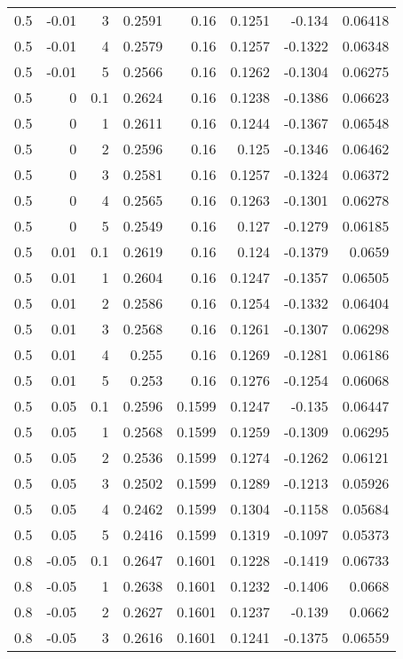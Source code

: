 \documentclass{amsart}
\theoremstyle{plain}
\numberwithin{equation}{section}
\begin{document}
\begin{longtable}{r | r | r | r | r | r | r | r}
0.5 & -0.01 & 3 & 0.2591 & 0.16 & 0.1251 & -0.134 & 0.06418 \\
0.5 & -0.01 & 4 & 0.2579 & 0.16 & 0.1257 & -0.1322 & 0.06348 \\
0.5 & -0.01 & 5 & 0.2566 & 0.16 & 0.1262 & -0.1304 & 0.06275 \\ \hline
0.5 & 0 & 0.1 & 0.2624 & 0.16 & 0.1238 & -0.1386 & 0.06623 \\
0.5 & 0 & 1 & 0.2611 & 0.16 & 0.1244 & -0.1367 & 0.06548 \\
0.5 & 0 & 2 & 0.2596 & 0.16 & 0.125 & -0.1346 & 0.06462 \\
0.5 & 0 & 3 & 0.2581 & 0.16 & 0.1257 & -0.1324 & 0.06372 \\
0.5 & 0 & 4 & 0.2565 & 0.16 & 0.1263 & -0.1301 & 0.06278 \\
0.5 & 0 & 5 & 0.2549 & 0.16 & 0.127 & -0.1279 & 0.06185 \\ \hline
0.5 & 0.01 & 0.1 & 0.2619 & 0.16 & 0.124 & -0.1379 & 0.0659 \\
0.5 & 0.01 & 1 & 0.2604 & 0.16 & 0.1247 & -0.1357 & 0.06505 \\
0.5 & 0.01 & 2 & 0.2586 & 0.16 & 0.1254 & -0.1332 & 0.06404 \\
0.5 & 0.01 & 3 & 0.2568 & 0.16 & 0.1261 & -0.1307 & 0.06298 \\
0.5 & 0.01 & 4 & 0.255 & 0.16 & 0.1269 & -0.1281 & 0.06186 \\
0.5 & 0.01 & 5 & 0.253 & 0.16 & 0.1276 & -0.1254 & 0.06068 \\ \hline
0.5 & 0.05 & 0.1 & 0.2596 & 0.1599 & 0.1247 & -0.135 & 0.06447 \\
0.5 & 0.05 & 1 & 0.2568 & 0.1599 & 0.1259 & -0.1309 & 0.06295 \\
0.5 & 0.05 & 2 & 0.2536 & 0.1599 & 0.1274 & -0.1262 & 0.06121 \\
0.5 & 0.05 & 3 & 0.2502 & 0.1599 & 0.1289 & -0.1213 & 0.05926 \\
0.5 & 0.05 & 4 & 0.2462 & 0.1599 & 0.1304 & -0.1158 & 0.05684 \\
0.5 & 0.05 & 5 & 0.2416 & 0.1599 & 0.1319 & -0.1097 & 0.05373 \\ \hline
0.8 & -0.05 & 0.1 & 0.2647 & 0.1601 & 0.1228 & -0.1419 & 0.06733 \\
0.8 & -0.05 & 1 & 0.2638 & 0.1601 & 0.1232 & -0.1406 & 0.0668 \\
0.8 & -0.05 & 2 & 0.2627 & 0.1601 & 0.1237 & -0.139 & 0.0662 \\
0.8 & -0.05 & 3 & 0.2616 & 0.1601 & 0.1241 & -0.1375 & 0.06559 \\

\end{longtable}
\end{document}
